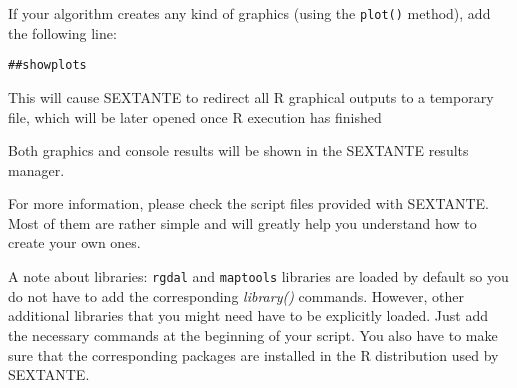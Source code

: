 If your algorithm creates any kind of graphics (using the \texttt{plot()} method), add the following line:

\begin{verbatim}
##showplots
\end{verbatim}

This will cause SEXTANTE to redirect all R graphical outputs to a temporary file, which will be later opened once R execution has finished

Both graphics and console results will be shown in the SEXTANTE results manager.

For more information, please check the script files provided with SEXTANTE. Most of them are rather simple and will greatly help you understand how to create your own ones.

A note about libraries: \texttt{rgdal} and \texttt{maptools} libraries are loaded by default so you do not have to add the corresponding \emph{library()} commands. However, other additional libraries that you might need have to be explicitly loaded. Just add the necessary commands at the beginning of your script. You also have to make sure that the corresponding packages are installed in the R distribution used by SEXTANTE.










